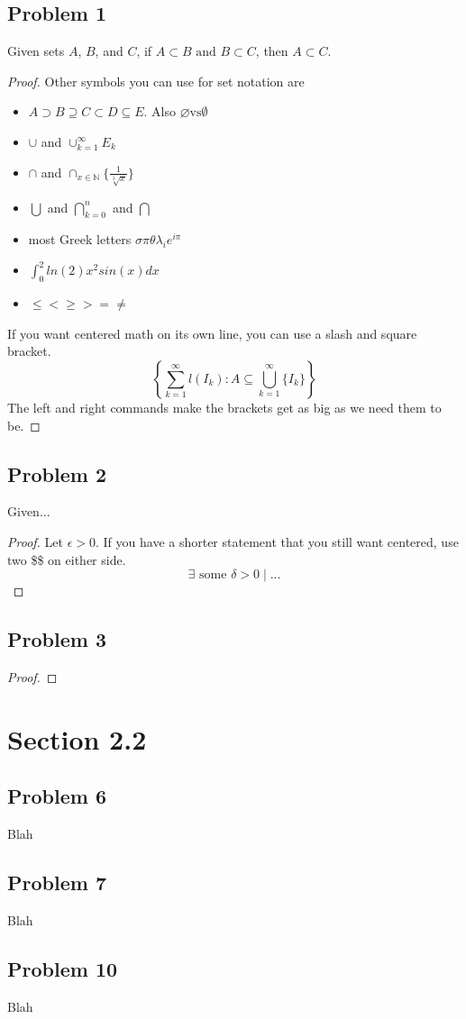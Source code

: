 \documentclass{article}
\begin{document}
\subsection*{Problem 1}
Given sets $A$, $B$, and $C$, if $A\subset B \textrm{ and } B \subset C$, then $A \subset C$.
\begin{proof}
Other symbols you can use for set notation are
\begin{itemize}
\item$A \supset B \supseteq C \subset D \subseteq E$. Also $\varnothing \textrm{vs} \emptyset$
\item$\cup$ and $\cup_{k=1}^\infty E_k$
\item$\cap$ and $\cap_{x \in \mathbb{N}} \{\frac{1}{\sqrt[3]{x}}\}$
\item$\bigcup$ and $\bigcap\limits_{k=0}^n$ and $\bigcap$
\item most Greek letters $\sigma \pi \theta \lambda_i e^{i\pi}$
\item $\int_0^2 ln(2)x^2sin(x) dx$
\item$\leq < \geq > = \neq$
\end{itemize}
If you want centered math on its own line, you can use a slash and square bracket.\\
\[
\left \{
\sum\limits_{k=1}^\infty l(I_k):A\subseteq \bigcup_{k=1}^\infty \{I_k\}
\right \}
\]
The left and right commands make the brackets get as big as we need them to be.
\end{proof}

\clearpage %
\subsection*{Problem 2}
Given...
\begin{proof}
Let $\epsilon>0$.
If you have a shorter statement that you still want centered, use two \$\$ on either side.
$$\exists \textrm{ some } \delta>0 \mid ...$$
\end{proof}

\subsection*{Problem 3}
%
\begin{proof}
%
\end{proof}

\section*{Section 2.2}
%
\subsection*{Problem 6}
Blah
\subsection*{Problem 7}
Blah
\subsection*{Problem 10}
Blah
\end{document}
